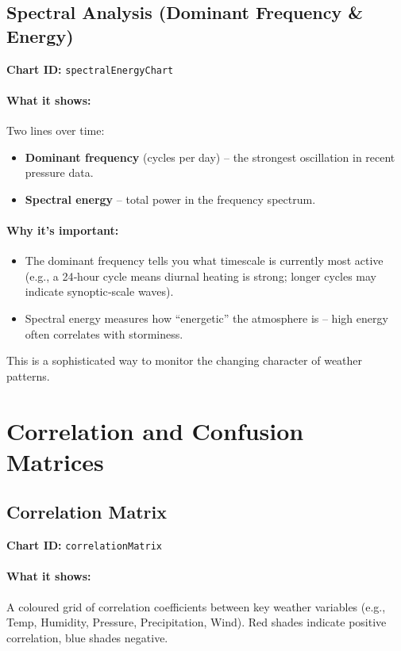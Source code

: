 \documentclass[11pt,a4paper]{article}
\begin{document}
	\subsection{Spectral Analysis (Dominant Frequency \& Energy)}
	\textbf{Chart ID:} \texttt{spectralEnergyChart}
	
	\paragraph{What it shows:}
	Two lines over time:
	\begin{itemize}
		\item \textbf{Dominant frequency} (cycles per day) – the strongest oscillation in recent pressure data.
		\item \textbf{Spectral energy} – total power in the frequency spectrum.
	\end{itemize}
	
	\paragraph{Why it’s important:}
	\begin{itemize}
		\item The dominant frequency tells you what timescale is currently most active (e.g., a 24‑hour cycle means diurnal heating is strong; longer cycles may indicate synoptic‑scale waves).
		\item Spectral energy measures how “energetic” the atmosphere is – high energy often correlates with storminess.
	\end{itemize}
	This is a sophisticated way to monitor the changing character of weather patterns.
	
	\section{Correlation and Confusion Matrices}
	
	\subsection{Correlation Matrix}
	\textbf{Chart ID:} \texttt{correlationMatrix}
	
	\paragraph{What it shows:}
	A coloured grid of correlation coefficients between key weather variables (e.g., Temp, Humidity, Pressure, Precipitation, Wind). Red shades indicate positive correlation, blue shades negative.
	
\end{document}
